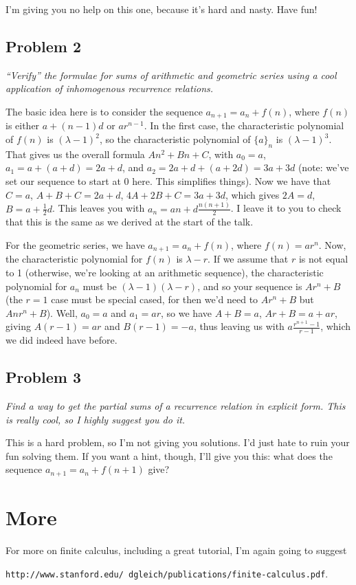 \documentclass[12pt,letterpaper]{article}
\begin{document}
I'm giving you no help on this one, because it's hard and nasty. Have fun!

\subsection{Problem 2}
\emph{``Verify'' the formulae for sums of arithmetic and geometric series using
a cool application of inhomogenous recurrence relations.}

The basic idea here is to consider the sequence $a_{n+1} = a_n + f(n)$, where
$f(n)$ is either $a + (n-1)d$ or $a r^{n-1}$. In the first case, the characteristic
polynomial of $f(n)$ is $(\lambda-1)^2$, so the characteristic polynomial of $\{a\}_n$
is $(\lambda-1)^3$. That gives us the overall formula $An^2 + Bn + C$, with
$a_0 = a$, $a_1 = a + (a + d) = 2a + d$, and $a_2 = 2a + d + (a + 2d) = 3a + 3d$
(note: we've set our sequence to start at 0 here. This simplifies things).
Now we have that $C = a$, $A + B + C = 2a + d$, $4A + 2B + C = 3a + 3d$, which
gives $2A = d$, $B = a + \frac12 d$. This leaves you with $a_n = a n + d\frac{n(n+1)}2$.
I leave it to you to check that this is the same as we derived at the start of
the talk.

For the geometric series, we have $a_{n+1} = a_n + f(n)$, where $f(n) = a r^n$.
Now, the characteristic polynomial for $f(n)$ is $\lambda - r$. If we assume
that $r$ is not equal to 1 (otherwise, we're looking at an arithmetic sequence),
the characteristic polynomial for $a_n$ must be $(\lambda - 1)(\lambda - r)$, and
so your sequence is $A r^n + B$ (the $r=1$ case must be special cased, for then
we'd need to $Ar^n + B$ but $Anr^n + B$). Well, $a_0 = a$ and $a_1 = ar$, so
we have $A + B = a$, $Ar + B = a + ar$, giving $A(r-1) = ar$ and $B(r-1)=-a$,
thus leaving us with $a \frac{r^{n+1}-1}{r-1}$, which we did indeed have before.

\subsection{Problem 3}
\emph{Find a way to get the partial sums of a recurrence relation in explicit
form. This is really cool, so I highly suggest you do it.}

This is a hard problem, so I'm not giving you solutions. I'd just hate to ruin your
fun solving them. If you want a hint, though, I'll give you this: what does the
sequence $a_{n+1} = a_n + f(n+1)$ give?

\section{More}
For more on finite calculus, including a great tutorial, I'm again going to suggest
\begin{center}\texttt{http://www.stanford.edu/\string~dgleich/publications/finite-calculus.pdf}.\end{center}
\end{document}
